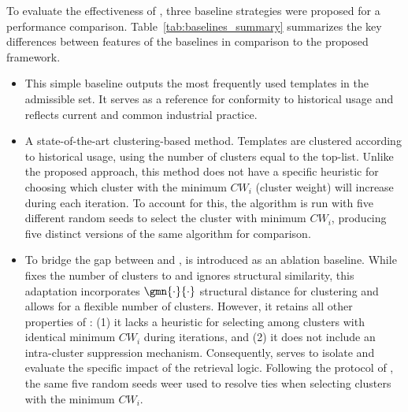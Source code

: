 To evaluate the effectiveness of \trs, three baseline strategies were proposed for a performance comparison. Table~\ref{tab:baselines_summary} summarizes the key differences between features of the baselines in comparison to the proposed framework.
\begin{itemize}
    \item[\textbf{Most Popular (\mostpopular)}] This simple baseline outputs the \topsize most frequently used templates in the admissible set. It serves as a reference for conformity to historical usage and reflects current and common industrial practice.
    \item[\textbf{Classic ClusDiv (\classicclusdiv)}] A state-of-the-art clustering-based method. Templates are clustered according to historical usage, using the number of clusters equal to the top-\topsize list. 
Unlike the proposed approach, this method does not have a specific heuristic for choosing which cluster with the minimum $CW_i$ (cluster weight) will increase during each iteration. To account for this, the algorithm is run with five different random seeds to select the cluster with minimum $CW_i$, producing five distinct versions of the same algorithm for comparison.

\item[\textbf{Adapted ClusDiv (\adaptedclusdiv)}] To bridge the gap between \classicclusdiv and \trs, \adaptedclusdiv is introduced as an ablation baseline. While \classicclusdiv fixes the number of clusters to \topsize and ignores structural similarity, this adaptation incorporates $\gmn{\cdot}{\cdot}$ structural distance for clustering and allows for a flexible number of clusters. However, it retains all other properties of \classicclusdiv: (1) it lacks a heuristic for selecting among clusters with identical minimum $CW_i$ during iterations, and (2) it does not include an intra-cluster suppression mechanism. Consequently, \adaptedclusdiv serves to isolate and evaluate the specific impact of the retrieval logic. 
Following the protocol of \classicclusdiv, the same five random seeds weer used to resolve ties when selecting clusters with the minimum $CW_i$.
\end{itemize}



